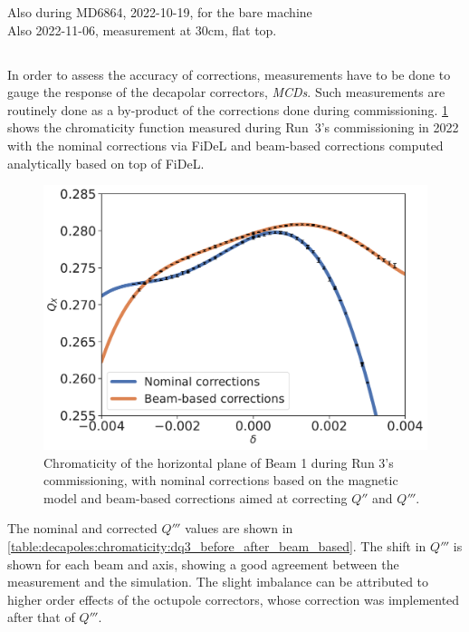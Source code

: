 Also during MD6864, 2022-10-19, for the bare machine \\
Also 2022-11-06, measurement at 30cm, flat top.


\subsection{}


In order to assess the accuracy of corrections, measurements have to be done to gauge the response
of the decapolar correctors, \textit{MCDs}.
Such measurements are routinely done as a by-product of the corrections done during commissioning.
\cref{figure:decapoles:chromaticity:dq3_comparison} shows the chromaticity function measured during
Run~3's commissioning in 2022 with the nominal corrections via FiDeL and beam-based corrections
computed analytically based on top of FiDeL.

\begin{figure}[tbh]
    \centering
    \includegraphics[width=0.8\columnwidth]{images/nominal_vs_beam_based_corrections.pdf}
    \caption{Chromaticity of the horizontal plane of Beam 1 during Run 3's commissioning, with
    nominal corrections based on the magnetic model and beam-based corrections aimed at correcting
     $Q''$ and $Q'''$.}
    \label{figure:decapoles:chromaticity:dq3_comparison}
\end{figure}

The nominal and corrected $Q'''$ values are shown in
\cref{table:decapoles:chromaticity:dq3_before_after_beam_based}. The shift in $Q'''$ is shown for
each beam and axis, showing a good agreement between the measurement and the simulation.
The slight imbalance can be attributed to higher order effects of the octupole correctors, whose
correction was implemented after that of $Q'''$.

